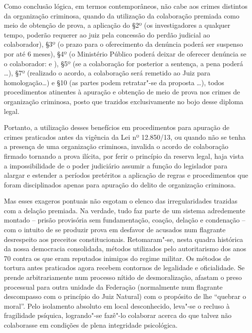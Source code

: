 Como conclusão lógica, em termos contemporâneos, não cabe aos crimes
distintos da organização criminosa, quando da utilização da colaboração
premiada como meio de obtenção de prova, a aplicação do §2º (os
investigadores a qualquer tempo, poderão requerer ao juiz pela concessão
do perdão judicial ao colaborador), §3º (o prazo para o oferecimento da
denúncia poderá ser suspenso por até 6 meses), §4º (o Ministério Público
poderá deixar de oferecer denúncia se o colaborador:  e ), §5º (se a
colaboração for posterior a sentença, a pena poderá \ldots{}), §7º (realizado
o acordo, a colaboração será remetido ao Juiz para homologação\ldots{}) e §10
(as partes podem retratar"-se da proposta \ldots{}), todos procedimentos
atinentes à apuração e obtenção de meio de prova nos crimes de
organização criminosa, posto que trazidos exclusivamente no bojo desse
diploma legal.

Portanto, a utilização desses benefícios em procedimentos para apuração
de crimes praticados antes da vigência da Lei nº 12.850/13, ou quando
não se tenha a presença de uma organização criminosa, invalida o acordo
de colaboração firmado tornando a prova ilícita, por ferir o princípio
da reserva legal, haja vista a impossibilidade de o poder judiciário
assumir a função do legislador para alargar e estender a períodos
pretéritos a aplicação de regras e procedimentos que foram disciplinados
apenas para apuração do delito de organização criminosa.

Mas esses exageros pontuais não esgotam o elenco das irregularidades
trazidas com a delação premiada. Na verdade, tudo faz parte de um
sistema adredemente montado -- prisão provisória sem fundamentação,
coação, delação e condenação -- com o intuito de se produzir prova em
desfavor de acusados num flagrante desrespeito aos preceitos
constitucionais. Retomaram"-se, nesta quadra histórica da nossa
democracia consolidada, métodos utilizados pelo autoritarismo dos anos
70 contra os que eram reputados inimigos do regime militar. Os métodos
de tortura antes praticados agora recebem contornos de legalidade e
oficialidade. Se prende arbitrariamente num processo nítido de
desmoralização, afastam o preso processual para outra unidade da
Federação (normalmente num flagrante descompasso com o princípio do Juiz
Natural) com o propósito de lhe ``quebrar o moral''. Pelo isolamento
absoluto em local desconhecido, leva"-se o recluso à fragilidade
psíquica, logrando"-se fazê"-lo colaborar acerca do que talvez não
colaborasse em condições de plena integridade psicológica.

